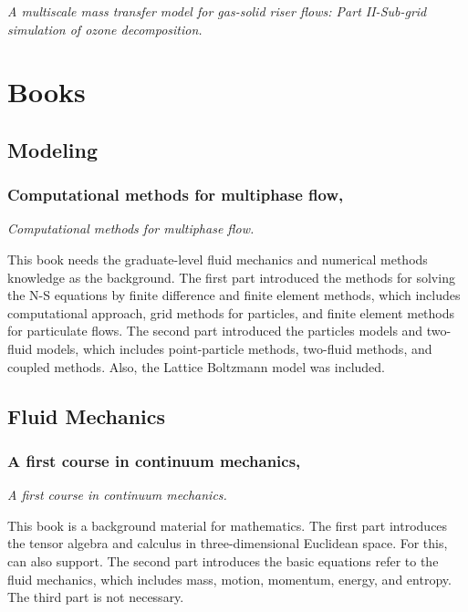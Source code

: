 \documentclass[11pt]{report}
\begin{document}
%
%
\subsection[2008]{\cite{Dong2008}}
\textit{A multiscale mass transfer model for gas-solid riser flows: Part II-Sub-grid simulation of ozone decomposition.} 



\chapter{Books}
\section{Modeling}
%
%
\subsection[Computational methods for multiphase flow]{Computational methods for multiphase flow, \cite{prosperetti2009computational}}
\textit{Computational methods for multiphase flow.}

This book needs the graduate-level fluid mechanics and numerical methods knowledge as the background. 
The first part introduced the methods for solving the N-S equations by finite difference and finite element methods, which includes computational approach, grid methods for particles, and finite element methods for particulate flows.
The second part introduced the particles models and two-fluid models, which includes point-particle methods, two-fluid methods, and coupled methods. 
Also, the Lattice Boltzmann model was included. 

\section{Fluid Mechanics}
%
%
\subsection[A first course in continuum mechanics]{A first course in continuum mechanics, \cite{gonzalez2008first}}
\textit{A first course in continuum mechanics.}

This book is a background material for mathematics. 
The first part introduces the tensor algebra and calculus in three-dimensional Euclidean space. 
For this, \cite{matthews2012vector} can also support. 
The second part introduces the basic equations refer to the fluid mechanics, which includes mass, motion, momentum, energy, and entropy. The third part is not necessary.
\end{document}
